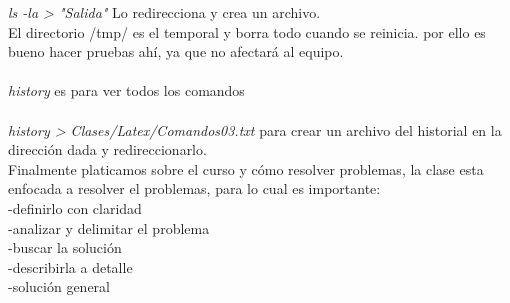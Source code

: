 \documentclass [letterpaper, 12 pts, oneside]{article}
\begin{document}
	\textit{ls -la > "Salida"} Lo redirecciona y crea un archivo.\\
El directorio /tmp/ es el temporal y borra todo cuando se reinicia. por ello es bueno hacer pruebas ahí, ya que no afectará al equipo.\\
	\\
\textit{	history} es para ver todos los comandos\\
	\\
	\textit{history > Clases/Latex/Comandos03.txt} para crear un archivo del historial en la dirección dada y redireccionarlo.\\

	
	Finalmente platicamos sobre el curso y cómo resolver problemas, la clase esta enfocada a resolver el problemas, para lo cual es importante:\\
	-definirlo con claridad\\
	-analizar y delimitar el problema\\
	-buscar la solución \\
	-describirla a detalle\\
	-solución general\\
	

	
	
\end{document}
